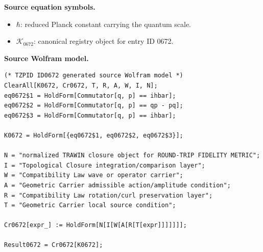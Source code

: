 \begin{minipage}[t]{0.49\linewidth}
\begingroup
\small
\raggedright
\textbf{Source equation symbols.}\par
\begin{itemize}[leftmargin=1.35em,itemsep=1pt,topsep=1pt,parsep=0pt]
    \item $\hbar$: reduced Planck constant carrying the quantum scale.
    \item $\mathcal{K}_{0672}$: canonical registry object for entry ID 0672.
\end{itemize}
\endgroup
\end{minipage}\hfill
\begin{minipage}[t]{0.47\linewidth}
\begingroup
\scriptsize
\raggedright
\textbf{Source Wolfram model.}\par
\begin{Verbatim}[fontsize=\tiny,breaklines=true,breakanywhere=true]
(* TZPID ID0672 generated source Wolfram model *)
ClearAll[K0672, Cr0672, T, R, A, W, I, N];
eq0672$1 = HoldForm[Commutator[q, p] == ihbar];
eq0672$2 = HoldForm[Commutator[q, p] == qp - pq];
eq0672$3 = HoldForm[Commutator[q, p] == ihbar];

K0672 = HoldForm[{eq0672$1, eq0672$2, eq0672$3}];

N = "normalized TRAWIN closure object for ROUND-TRIP FIDELITY METRIC";
I = "Topological Closure integration/comparison layer";
W = "Compatibility Law wave or operator carrier";
A = "Geometric Carrier admissible action/amplitude condition";
R = "Compatibility Law rotation/curl preservation layer";
T = "Geometric Carrier local source condition";

Cr0672[expr_] := HoldForm[N[I[W[A[R[T[expr]]]]]]];

Result0672 = Cr0672[K0672];
\end{Verbatim}
\endgroup
\end{minipage}

